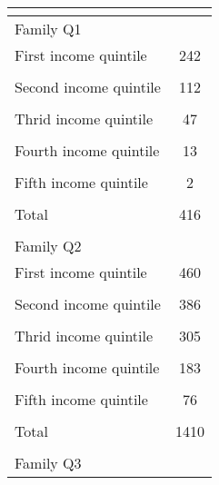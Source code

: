 {
\def\sym#1{\ifmmode^{#1}\else\(^{#1}\)\fi}
\begin{tabular}{l*{1}{c}}
\toprule
                    &\multicolumn{1}{c}{} \\
\midrule
Family Q1           &                     \\
First income quintile&         242         \\
                    &                     \\
\addlinespace
Second income quintile&         112         \\
                    &                     \\
\addlinespace
Thrid income quintile&          47         \\
                    &                     \\
\addlinespace
Fourth income quintile&          13         \\
                    &                     \\
\addlinespace
Fifth income quintile&           2         \\
                    &                     \\
\addlinespace
Total               &         416         \\
                    &                     \\
\midrule
Family Q2           &                     \\
First income quintile&         460         \\
                    &                     \\
\addlinespace
Second income quintile&         386         \\
                    &                     \\
\addlinespace
Thrid income quintile&         305         \\
                    &                     \\
\addlinespace
Fourth income quintile&         183         \\
                    &                     \\
\addlinespace
Fifth income quintile&          76         \\
                    &                     \\
\addlinespace
Total               &        1410         \\
                    &                     \\
\midrule
Family Q3           &                     \\

\end{tabular}}
